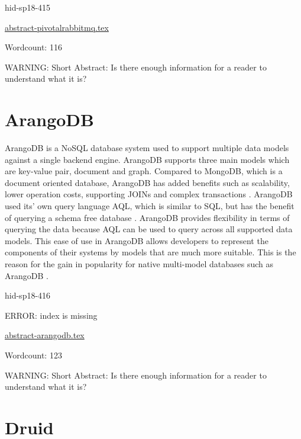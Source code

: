 \begin{IU}

hid-sp18-415

\href{https://github.com/cloudmesh-community/hid-sp18-415/blob/master//technology/abstract-pivotalrabbitmq.tex}{abstract-pivotalrabbitmq.tex}

 

Wordcount: 116

WARNING: Short Abstract: Is there enough information for a reader to understand what it is?

\end{IU}

\section{ArangoDB}

ArangoDB is a NoSQL database system used to support multiple data models against
a single backend engine. ArangoDB supports three main models which are key-value
pair, document and graph. Compared to MongoDB, which is a document oriented
database, ArangoDB has added benefits such as scalability, lower operation
costs, supporting JOINs and complex transactions
\cite{hid-sp18-416-www-arangodb}. ArangoDB used its’ own query language AQL,
which is similar to SQL,
but has the benefit of querying a schema free database
\cite{hid-sp18-416-www-aql-blog}. ArangoDB provides flexibility in terms of
querying the data because
AQL can be used to query across all supported data models. This ease of use in
ArangoDB allows developers to represent the components of their systems by
models that are much more suitable. This is the reason for the gain in
popularity for native multi-model databases such as ArangoDB
\cite{hid-sp18-416-www-graphdb-blog}.

\begin{IU}

hid-sp18-416

ERROR: index is missing

\href{https://github.com/cloudmesh-community/hid-sp18-416/blob/master//technology/abstract-arangodb.tex}{abstract-arangodb.tex}

 

Wordcount: 123

WARNING: Short Abstract: Is there enough information for a reader to understand what it is?

\end{IU}

\section{Druid}

